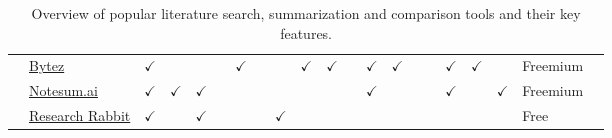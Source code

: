 \begin{table}[h!]
{\begin{tabular}{lllll|llll|lllll|lllll|ll}
 & \href{https://dev.bytez.com/}{Bytez} & $\checkmark$ &  &  &  & $\checkmark$ &  &  & $\checkmark$ & $\checkmark$ &  & $\checkmark$ & $\checkmark$ &  &  & $\checkmark$ & $\checkmark$ &  & Freemium &  \\ 
 & \href{https://notesum.ai/}{Notesum.ai} & $\checkmark$ & $\checkmark$ & $\checkmark$ &  &  &  &  &  &  &  & $\checkmark$ &  &  &  & $\checkmark$ &  & $\checkmark$ & Freemium &  \\ 
 & \href{https://www.researchrabbit.ai/}{Research Rabbit} & $\checkmark$ &  & $\checkmark$ &  &  &  & $\checkmark$ &  &  &  &  &  &  &  &  &  &  & Free &  \\
\end{tabular}%
}
\caption{Overview of popular literature search, summarization and comparison tools and their key features.}
\label{tab:google_scholar}
\end{table}


